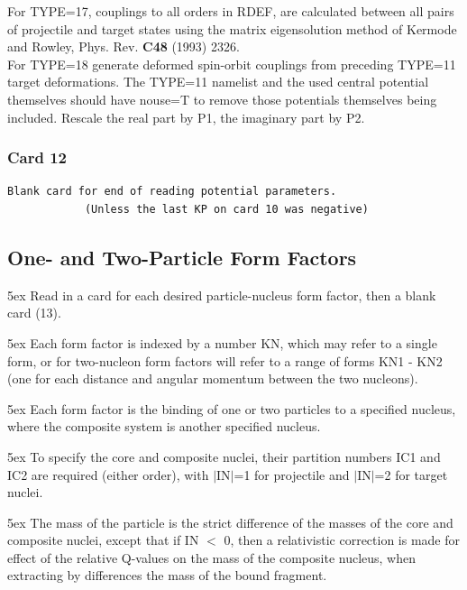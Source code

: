 \documentclass[11pt]{article}
\begin{document}
For TYPE=17, couplings to all orders in RDEF, are calculated between all
pairs of projectile and target states using the matrix eigensolution
method of Kermode and Rowley, Phys. Rev. {\bf C48} (1993) 2326.\\

For TYPE=18  generate deformed spin-orbit couplings from preceding TYPE=11 target 
deformations.  The TYPE=11 namelist and the used central potential themselves should
have nouse=T to remove those potentials  themselves being included.
Rescale the real part by P1, the imaginary part by P2.



\bigskip
\subsubsection*{Card 12}

\begin{verbatim}
Blank card for end of reading potential parameters.
            (Unless the last KP on card 10 was negative)
\end{verbatim}

\newpage
\subsection{One- and Two-Particle Form Factors}
%
\bigskip


\hangindent 5ex
Read in a card for each desired particle-nucleus form factor,
then a blank card (13).

\hangindent 5ex
Each form factor is indexed by a number KN, which may refer to
a single form, or for two-nucleon form factors will refer to a range
of forms KN1 - KN2
(one for each distance and angular momentum between the two nucleons).

\hangindent 5ex
Each form factor is the binding of one or two particles to a
specified nucleus, where the composite system is another specified
nucleus.

\hangindent 5ex
To specify the core and composite nuclei, their partition numbers
IC1 and IC2 are required (either order), with $|$IN$|$=1 for projectile
and $|$IN$|$=2 for target nuclei.

\hangindent 5ex
The mass of the particle is the strict difference of the masses of
the core and composite nuclei, except that if IN $<$ 0, then a
relativistic correction is made for effect of the relative Q-values
on the mass of the composite nucleus, when extracting by differences
the mass of the bound fragment.
\end{document}
